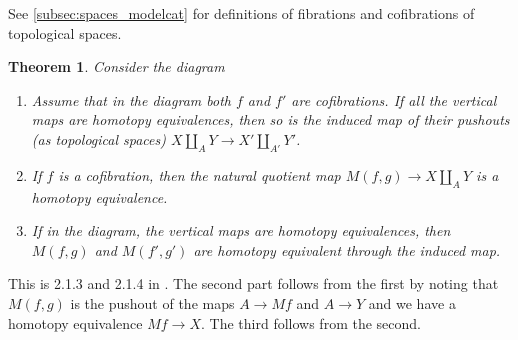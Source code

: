 \documentclass{scrartcl}
\theoremstyle{plain}
\newtheorem{theorem}{Theorem}[section]
\theoremstyle{definition}
\newtheorem{remark}[theorem]{Remark}
\renewcommand{\coprod}{\mathbin{\amalg}}
\begin{document}


See \ref{subsec:spaces_modelcat} for definitions of fibrations and cofibrations of topological spaces.
\begin{theorem}
    Consider the diagram

    \begin{center}
    \end{center}

    \begin{enumerate}
    \item Assume that in the diagram 
    both $f$ and $f'$ are cofibrations. If all the vertical maps are homotopy equivalences, then so is the induced map of their pushouts (as topological spaces) $X\coprod_A Y \to X'\coprod_{A'} Y'$.
    \item If $f$ is a cofibration, then the natural quotient map $M(f,g)\to X\coprod_A Y$ is a homotopy equivalence.
    \item If in the diagram, the vertical maps are homotopy equivalences, then $M(f, g)$ and $M(f', g')$ are homotopy equivalent through the induced map.
    \end{enumerate}
\end{theorem}
This is 2.1.3 and 2.1.4 in \cite{may2011more}. The second part follows from the first by noting that $M(f, g)$ is the pushout of the maps $A\to Mf$ and $A\to Y$ and we have a homotopy equivalence $Mf \to X$. The third follows from the second.
\end{document}
